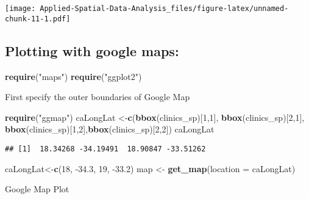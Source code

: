 \documentclass[
]{book}
\newenvironment{Shaded}{\begin{snugshade}}{\end{snugshade}}
\newcommand{\DataTypeTok}[1]{\textcolor[rgb]{0.13,0.29,0.53}{#1}}
\newcommand{\DecValTok}[1]{\textcolor[rgb]{0.00,0.00,0.81}{#1}}
\newcommand{\FloatTok}[1]{\textcolor[rgb]{0.00,0.00,0.81}{#1}}
\newcommand{\KeywordTok}[1]{\textcolor[rgb]{0.13,0.29,0.53}{\textbf{#1}}}
\newcommand{\NormalTok}[1]{#1}
\newcommand{\StringTok}[1]{\textcolor[rgb]{0.31,0.60,0.02}{#1}}
\begin{document}
\texttt{[image: Applied-Spatial-Data-Analysis\_files/figure-latex/unnamed-chunk-11-1.pdf]}

\hypertarget{plotting-with-google-maps}{%
\subsection{Plotting with google maps:}\label{plotting-with-google-maps}}

\begin{Shaded}
\begin{Highlighting}[]
\KeywordTok{require}\NormalTok{(}\StringTok{"maps"}\NormalTok{)}
\KeywordTok{require}\NormalTok{(}\StringTok{"ggplot2"}\NormalTok{)}
\end{Highlighting}
\end{Shaded}

First specify the outer boundaries of Google Map

\begin{Shaded}
\begin{Highlighting}[]
\KeywordTok{require}\NormalTok{(}\StringTok{"ggmap"}\NormalTok{)}
\NormalTok{caLongLat <-}\KeywordTok{c}\NormalTok{(}\KeywordTok{bbox}\NormalTok{(clinics_sp)[}\DecValTok{1}\NormalTok{,}\DecValTok{1}\NormalTok{], }\KeywordTok{bbox}\NormalTok{(clinics_sp)[}\DecValTok{2}\NormalTok{,}\DecValTok{1}\NormalTok{], }\KeywordTok{bbox}\NormalTok{(clinics_sp)[}\DecValTok{1}\NormalTok{,}\DecValTok{2}\NormalTok{],}\KeywordTok{bbox}\NormalTok{(clinics_sp)[}\DecValTok{2}\NormalTok{,}\DecValTok{2}\NormalTok{])}
\NormalTok{caLongLat}
\end{Highlighting}
\end{Shaded}

\begin{verbatim}
## [1]  18.34268 -34.19491  18.90847 -33.51262
\end{verbatim}

\begin{Shaded}
\begin{Highlighting}[]
\NormalTok{caLongLat<-}\KeywordTok{c}\NormalTok{(}\DecValTok{18}\NormalTok{, }\FloatTok{-34.3}\NormalTok{,  }\DecValTok{19}\NormalTok{, }\FloatTok{-33.2}\NormalTok{)}
\NormalTok{map <-}\StringTok{ }\KeywordTok{get_map}\NormalTok{(}\DataTypeTok{location =}\NormalTok{ caLongLat)}
\end{Highlighting}
\end{Shaded}

Google Map Plot
\end{document}

